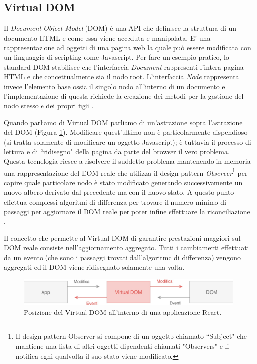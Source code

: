 \subsection{Virtual DOM}
Il  \textit{Document Object Model} (DOM) è una API che definisce la struttura di un documento HTML e come essa viene acceduta e manipolata. E' una rappresentazione ad oggetti di una pagina web la quale può essere modificata con un linguaggio di scripting come Javascript.
Per fare un esempio pratico, lo standard DOM stabilisce che l'interfaccia \textit{Document} rappresenti l'intera pagina HTML e che concettualmente sia il nodo root. L'interfaccia \textit{Node} rappresenta invece l'elemento base ossia il singolo nodo all'interno di un documento e l'implementazione di questa richiede la creazione dei metodi per la gestione del nodo stesso e dei propri figli \cite{HWRWhatIsDOM}.

Quando parliamo di Virtual DOM parliamo di un'astrazione sopra l'astrazione del DOM (Figura \ref{virtualDOMWorkflow}). Modificare quest'ultimo non è particolarmente dispendioso (si tratta solamente di modificare un oggetto Javascript); è tuttavia il processo di lettura e di “ridisegno" della pagina da parte del browser il vero problema. Questa tecnologia riesce a risolvere il suddetto problema mantenendo in memoria una rappresentazione del DOM reale che utilizza il design pattern \textit{Observer}\footnote{Il design pattern Observer si compone di un oggetto chiamato “Subject" che mantiene una lista di altri oggetti dipendenti chiamati "Observers" e li notifica ogni qualvolta il suo stato viene modificato.} per capire quale particolare nodo è stato modificato generando successivamente un nuovo albero derivato dal precedente ma con il nuovo stato. A questo punto effettua complessi algoritmi di differenza per trovare il numero minimo di passaggi per aggiornare il DOM reale per poter infine effettuare la riconciliazione \cite{MishraOnVirtualDOM}.

Il concetto che permette al Virtual DOM di garantire prestazioni maggiori sul DOM reale consiste nell'aggiornamento aggregato. Tutti i cambiamenti effettuati da un evento (che sono i passaggi trovati dall'algoritmo di differenza) vengono aggregati ed il DOM viene ridisegnato solamente una volta.

\begin{figure}[h]
\centering 
\vspace*{0.5cm}
\includegraphics[width=13cm]{./images/virtualDOMWorkflow}
\caption{Posizione del Virtual DOM all'interno di una applicazione React.}
\label{virtualDOMWorkflow}
\vspace*{0.5cm}
\end{figure}

